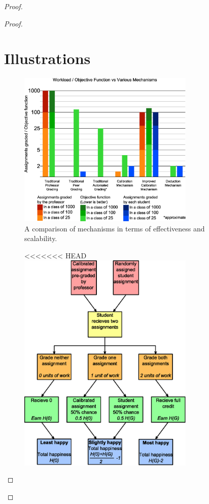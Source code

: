 \documentclass[12pt, Arial]{article}
\begin{document}
\begin{proof}
\begin{proof}
\section{Illustrations}
{
\noindent
\begin{figure}[!h]
	\centering
		\includegraphics[width=0.75\textwidth]{Comparison.eps}
		\caption {A comparison of mechanisms in terms of effectiveness and scalability.\label{fig:comparison}}
\end{figure}
\begin{figure}
	\centering
<<<<<<< HEAD
		\includegraphics[width=0.75\textwidth]{Flowchart-Calibration.eps}

\end{figure}}
\end{proof}
\end{proof}
\end{document}
